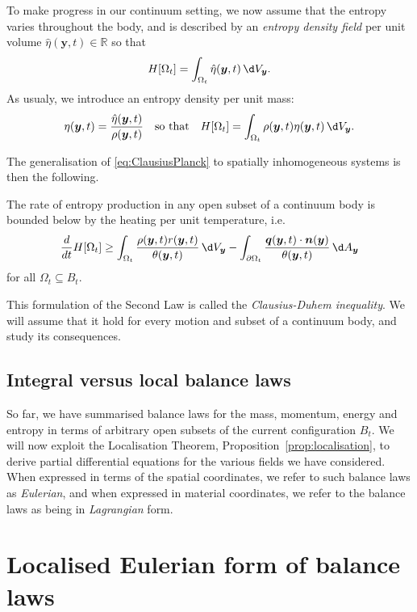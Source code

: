 \documentclass[
  letterpaper,
  DIV=11,
  numbers=noendperiod]{scrreprt}
\theoremstyle{plain}
\theoremstyle{remark}
\begin{document}
To make progress in our continuum setting, we now assume that the
entropy varies throughout the body, and is described by an \emph{entropy
density field} per unit volume
\(\hat{\eta}({\boldsymbol{y}},t)\in{\mathbb{R}}\) so that
\[H[\Omega_t] = \int_{\Omega_t}\hat{\eta}({\boldsymbol{y}},t){\,\d V_{{\boldsymbol{y}}}}.\]
As usualy, we introduce an entropy density per unit mass:
\[\eta({\boldsymbol{y}},t) = \frac{\hat{\eta}({\boldsymbol{y}},t)}{\rho({\boldsymbol{y}},t)}\quad\text{so that}\quad H[\Omega_t] = \int_{\Omega_t}\rho({\boldsymbol{y}},t)\eta({\boldsymbol{y}},t){\,\d V_{{\boldsymbol{y}}}}.\]

The generalisation of
\hyperref[eq:ClausiusPlanck]{{[}eq:ClausiusPlanck{]}} to spatially
inhomogeneous systems is then the following.

\label{ax:2ndLaw}{} The rate of entropy production in any
open subset of a continuum body is bounded below by the heating per unit
temperature, i.e.
\[\frac{d}{dt}H[\Omega_t] \geq \int_{\Omega_t}\frac{\rho({\boldsymbol{y}},t)r({\boldsymbol{y}},t)}{\theta({\boldsymbol{y}},t)}{\,\d V_{{\boldsymbol{y}}}}-\int_{\partial \Omega_t}\frac{{\boldsymbol{q}}({\boldsymbol{y}},t)\cdot{\boldsymbol{n}}({\boldsymbol{y}})}{\theta({\boldsymbol{y}},t)}{\,\d A_{{\boldsymbol{y}}}}\]
for all \(\Omega_t\subseteq B_t\).

This formulation of the Second Law is called the \emph{Clausius-Duhem
inequality}. We will assume that it hold for every motion and subset of
a continuum body, and study its consequences.

\subsection{Integral versus local balance
laws}\label{integral-versus-local-balance-laws}

So far, we have summarised balance laws for the mass, momentum, energy
and entropy in terms of arbitrary open subsets of the current
configuration \(B_t\). We will now exploit the Localisation Theorem,
Proposition~\hyperref[prop:localisation]{{[}prop:localisation{]}}, to
derive partial differential equations for the various fields we have
considered. When expressed in terms of the spatial coordinates, we refer
to such balance laws as \emph{Eulerian}, and when expressed in material
coordinates, we refer to the balance laws as being in \emph{Lagrangian}
form.

\section{Localised Eulerian form of balance
laws}\label{localised-eulerian-form-of-balance-laws}
\end{document}
